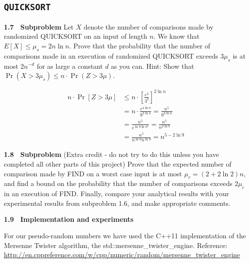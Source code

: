 \documentclass[article,a4paper,oneside]{article}
\newcommand{\+}[1]{\ensuremath{\boldsymbol{#1}}}
\begin{document}
\subsection*{\texttt{QUICKSORT}}

{\bf 1.7 \ Subproblem} Let $X$ denote the number of comparisons made by
randomized QUICKSORT on an input of length $n$. We know that $E[X]
\leq \mu_s= 2n\ln n$.  Prove that the probability that the number of
comparisons made in an execution of randomized QUICKSORT exceeds
$3\mu_s$ is at most $2n^{-d}$ for as large a constant $d$ as you can.
Hint: Show that $\Pr(X>3\mu_s)\leq n\cdot\Pr(Z>3\mu)$.



\begin{align*}
n\cdot \Pr[Z>3\mu] &\leq n\cdot \left [ \frac{e^2}{3^2} \right ]^{2\ln n}\\
&=n\cdot\frac{e^{4\ln n}}{9^{2\ln n}} =\frac{n^5}{9^{2\ln n}}\\
&=\frac{n^5}{e^{\ln 9 \ln n^2}} =\frac{n^5}{n^{2\ln 9}}\\
&=\frac{n^5}{n^{\ln 9}n^{\ln 9}} =n^{5-2\ln 9}
\end{align*}


{\bf 1.8 \ Subproblem} (Extra credit - do not try to do this unless
you have completed all other parts of this project) Prove
that the expected number of comparison made by FIND on a worst case
input is at most $\mu_c=(2+2\ln 2)n$, and find a bound on the
probability that the number of comparisons exceeds $2\mu_c$ in an
execution of FIND.  Finally, compare your analytical results with your
experimental results from subproblem 1.6, and make appropriate
comments.



{\bf 1.9 \ Implementation and experiments}

For our pseudo-random numbers we have used the C++11 implementation of the Mersenne Twister algorithm, the std::mersenne\_twister\_engine. Reference: \url{ http://en.cppreference.com/w/cpp/numeric/random/mersenne_twister_engine}

\end{document}
